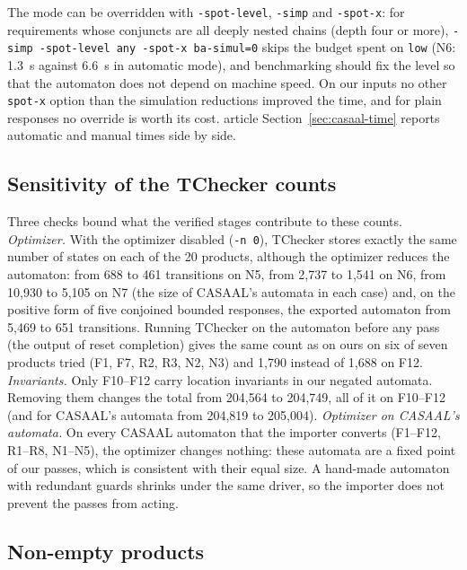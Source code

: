 The mode can be overridden with \texttt{-spot-level}, \texttt{-simp} and \texttt{-spot-x}: for requirements whose conjuncts are all deeply nested chains (depth four or more), \texttt{-simp -spot-level any -spot-x ba-simul=0} skips the budget spent on \texttt{low} (N6: 1.3~s against 6.6~s in automatic mode), and benchmarking should fix the level so that the automaton does not depend on machine speed. On our inputs no other \texttt{spot-x} option than the simulation reductions improved the time, and for plain responses no override is worth its cost. article Section~\ref{sec:casaal-time} reports automatic and manual times side by side.




\subsection{Sensitivity of the TChecker counts}\label{sec:tck-sensitivity-detail}

Three checks bound what the verified stages contribute to these counts.
\emph{Optimizer.} With the optimizer disabled (\texttt{-n 0}), TChecker stores exactly the same
number of states on each of the 20 products, although the optimizer reduces the automaton: from 688 to 461
transitions on N5, from 2{,}737 to 1{,}541 on N6, from 10{,}930 to 5{,}105 on N7 (the size of CASAAL's automata
in each case) and, on the positive form of five conjoined bounded responses, the exported automaton from
5{,}469 to 651 transitions. Running TChecker on the automaton before any pass (the output of reset
completion) gives the same count as on ours on six of seven products tried (F1, F7, R2, R3, N2, N3) and
1{,}790 instead of 1{,}688 on F12.
\emph{Invariants.} Only F10--F12 carry location invariants in our negated automata. Removing
them changes the total from 204{,}564 to 204{,}749, all of it on F10--F12 (and for CASAAL's automata from
204{,}819 to 205{,}004).
\emph{Optimizer on CASAAL's automata.} On every CASAAL automaton that the importer converts (F1--F12,
R1--R8, N1--N5), the optimizer changes nothing: these automata are a fixed point of our passes, which is
consistent with their equal size. A hand-made automaton with redundant guards shrinks under the same
driver, so the importer does not prevent the passes from acting.

\subsection{Non-empty products}

